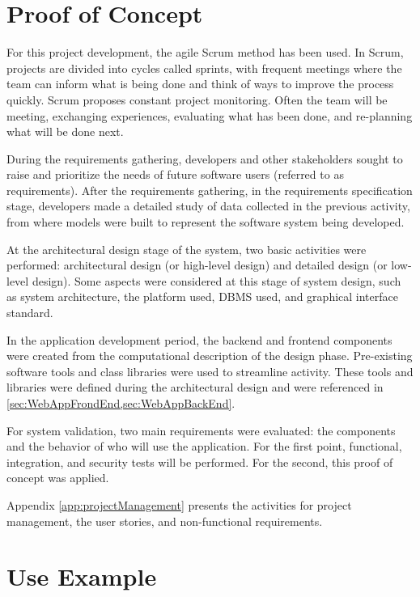 
\acresetall 

\section{Proof of Concept}\label{sec:method}

For this project development, the agile Scrum method has been used. In Scrum, projects are divided into cycles called sprints, with frequent meetings where the team can inform what is being done and think of ways to improve the process quickly. Scrum proposes constant project monitoring. Often the team will be meeting, exchanging experiences, evaluating what has been done, and re-planning what will be done next.

During the requirements gathering, developers and other stakeholders sought to raise and prioritize the needs of future software users (referred to as requirements). After the requirements gathering, in the requirements specification stage, developers made a detailed study of data collected in the previous activity, from where models were built to represent the software system being developed.

At the architectural design stage of the system, two basic activities were performed: architectural design (or high-level design) and detailed design (or low-level design). Some aspects were considered at this stage of system design, such as system architecture, the platform used, \ac{DBMS} used, and graphical interface standard.

In the application development period, the backend and frontend components were created from the computational description of the design phase. Pre-existing software tools and class libraries were used to streamline activity. These tools and libraries were defined during the architectural design and were referenced in \cref{sec:WebAppFrondEnd,sec:WebAppBackEnd}.

For system validation, two main requirements were evaluated: the components and the behavior of who will use the application. For the first point, functional, integration, and security tests will be performed. For the second, this proof of concept was applied.

Appendix \ref{app:projectManagement} presents the activities for project management, the user stories, and non-functional requirements. 


\section{Use Example}\label{sec:workflow}

